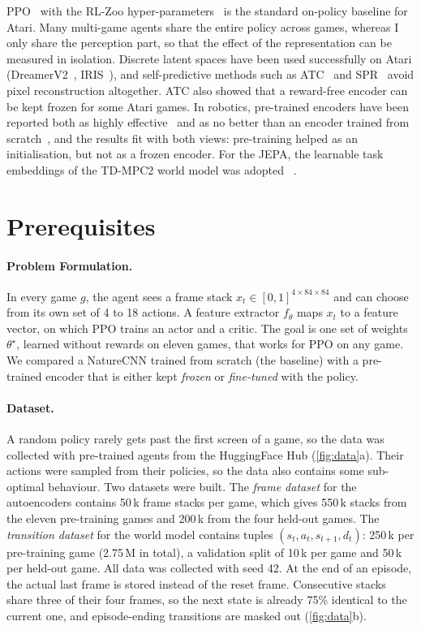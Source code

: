 \documentclass[runningheads]{llncs}
\begin{document}
PPO~\cite{schulman2017ppo} with the RL-Zoo hyper-parameters~\cite{raffin2020zoo} is the
standard on-policy baseline for Atari. Many multi-game agents share the entire policy across games, whereas I only share the
perception part, so that the effect of the representation can be measured in isolation. Discrete latent spaces have been used
successfully on Atari (DreamerV2~\cite{hafner2021dreamerv2}, IRIS~\cite{micheli2023iris}), and
self-predictive methods such as ATC~\cite{stooke2021atc} and SPR~\cite{schwarzer2021spr} avoid
pixel reconstruction altogether. ATC also showed that a reward-free encoder can be kept frozen for some Atari games. In robotics, pre-trained encoders have been reported both
as highly effective~\cite{parisi2022pvr} and as no better than an encoder trained from
scratch~\cite{hansen2022pretrained}, and the results fit with both views: pre-training helped
as an initialisation, but not as a frozen encoder. For the JEPA, the learnable task embeddings of the TD-MPC2 world model was adopted ~\cite{hansen2024tdmpc2}.

\section{Prerequisites}
\label{sec:prereq}

\paragraph{Problem Formulation.} In every game $g$, the agent sees a frame stack
$x_t\in[0,1]^{4\times84\times84}$ and can choose from its own set of 4 to 18 actions. A feature
extractor $f_\theta$ maps $x_t$ to a feature vector, on which PPO trains an actor and a critic.
The goal is one set of weights $\theta^\star$, learned without rewards on eleven games, that
works for PPO on any game. We compared a NatureCNN trained from scratch (the baseline) with a
pre-trained encoder that is either kept \emph{frozen} or \emph{fine-tuned} with the policy.

\paragraph{Dataset.} A random policy rarely gets past the first screen of a game, so the data was collected with pre-trained agents from the HuggingFace Hub (\cref{fig:data}a). Their actions were sampled from their policies, so the data also contains some sub-optimal
behaviour. Two datasets were built. The \emph{frame dataset} for the
autoencoders contains 50\,k frame stacks per game, which gives 550\,k stacks from the eleven
pre-training games and 200\,k from the four held-out games. The \emph{transition dataset} for
the world model contains tuples $(s_t,a_t,s_{t+1},d_t)$: 250\,k per pre-training game (2.75\,M in
total), a validation split of 10\,k per game and 50\,k per held-out game. All data was
collected with seed 42. At the end of an episode, the actual last frame is stored instead of the reset frame.
Consecutive stacks share three of their four frames, so the next state is already 75\%
identical to the current one, and episode-ending transitions are masked out (\cref{fig:data}b).
\end{document}

